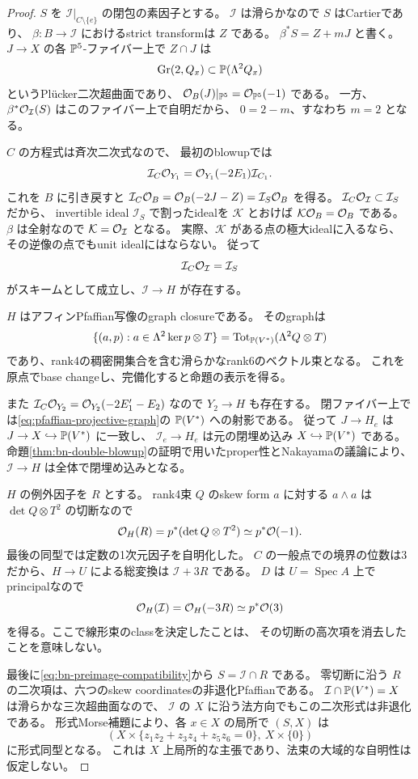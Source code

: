 \begin{proof}
$S$ を $\mathcal I|_{C\setminus\{e\}}$ の閉包の素因子とする。
$\mathcal I$ は滑らかなので $S$ はCartierであり、
$\beta:B\to\mathcal I$ におけるstrict transformは $Z$ である。
$\beta^*S=Z+mJ$ と書く。
$J\to X$ の各 $\mathbb P^5$-ファイバー上で $Z\cap J$ は
\[
 \operatorname{Gr}(2,Q_x)\subset\mathbb P(\Lambda^2Q_x)
\]
というPl\"ucker二次超曲面であり、
$\mathcal O_B(J)|_{\mathbb P^5}=\mathcal O_{\mathbb P^5}(-1)$ である。
一方、$\beta^*\mathcal O_{\mathcal I}(S)$ はこのファイバー上で自明だから、
$0=2-m$、すなわち $m=2$ となる。

$C$ の方程式は斉次二次式なので、
最初のblowupでは
\[
 \mathcal I_C\mathcal O_{Y_1}
 =\mathcal O_{Y_1}(-2E_1)\mathcal I_{C_1}.
\]
これを $B$ に引き戻すと
$\mathcal I_C\mathcal O_B=\mathcal O_B(-2J-Z)=\mathcal I_S\mathcal O_B$ を得る。
$\mathcal I_C\mathcal O_{\mathcal I}\subset\mathcal I_S$ だから、
invertible ideal $\mathcal I_S$ で割ったidealを $\mathcal K$ とおけば
$\mathcal K\mathcal O_B=\mathcal O_B$ である。
$\beta$ は全射なので $\mathcal K=\mathcal O_{\mathcal I}$ となる。
実際、$\mathcal K$ がある点の極大idealに入るなら、
その逆像の点でもunit idealにはならない。
従って
\begin{equation}\label{eq:bn-preimage-compatibility}
 \mathcal I_C\mathcal O_{\mathcal I}=\mathcal I_S
\end{equation}
がスキームとして成立し、$\mathcal I\to H$ が存在する。

$H$ はアフィンPfaffian写像のgraph closureである。
そのgraphは
\[
 \{(a,p):a\in\Lambda^2\ker p\otimes T\}
 =\operatorname{Tot}_{\mathbb P(V^*)}(\Lambda^2Q\otimes T)
\]
であり、rank4の稠密開集合を含む滑らかなrank6のベクトル束となる。
これを原点でbase changeし、完備化すると命題の表示を得る。

また $\mathcal I_C\mathcal O_{Y_2}=\mathcal O_{Y_2}(-2E_1'-E_2)$ なので
$Y_2\to H$ も存在する。
閉ファイバー上では\eqref{eq:pfaffian-projective-graph}の $\mathbb P(V^*)$ への射影である。
従って $J\to H_e$ は $J\to X\hookrightarrow\mathbb P(V^*)$ に一致し、
$\mathcal I_e\to H_e$ は元の閉埋め込み $X\hookrightarrow\mathbb P(V^*)$ である。
命題\ref{thm:bn-double-blowup}の証明で用いたproper性とNakayamaの議論により、
$\mathcal I\to H$ は全体で閉埋め込みとなる。

$H$ の例外因子を $R$ とする。
rank4束 $Q$ のskew form $a$ に対する $a\wedge a$ は
$\det Q\otimes T^2$ の切断なので
\[
 \mathcal O_H(R)=p^*(\det Q\otimes T^2)\simeq p^*\mathcal O(-1).
\]
最後の同型では定数の1次元因子を自明化した。
$C$ の一般点での境界の位数は3だから、$H\to U$ による総変換は
$\mathcal I+3R$ である。
$D$ は $U=\operatorname{Spec}A$ 上でprincipalなので
\[
 \mathcal O_H(\mathcal I)=\mathcal O_H(-3R)\simeq p^*\mathcal O(3)
\]
を得る。ここで線形束のclassを決定したことは、
その切断の高次項を消去したことを意味しない。

最後に\eqref{eq:bn-preimage-compatibility}から $S=\mathcal I\cap R$ である。
零切断に沿う $R$ の二次項は、六つのskew coordinatesの非退化Pfaffianである。
$\mathcal I\cap\mathbb P(V^*)=X$ は滑らかな三次超曲面なので、
$\mathcal I$ の $X$ に沿う法方向でもこの二次形式は非退化である。
形式Morse補題により、各 $x\in X$ の局所で $(S,X)$ は
\[
 \left(X\times
 \{z_1z_2+z_3z_4+z_5z_6=0\},\ X\times\{0\}\right)
\]
に形式同型となる。
これは $X$ 上局所的な主張であり、法束の大域的な自明性は仮定しない。
\end{proof}


